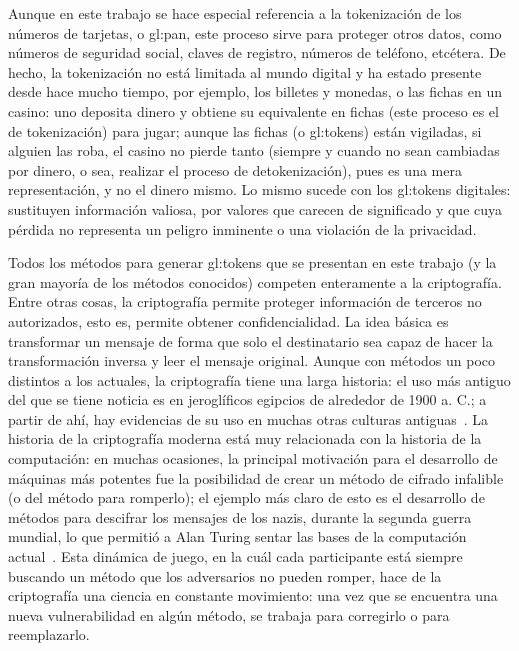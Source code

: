 Aunque en este trabajo se hace especial referencia a la tokenización de los
números de tarjetas, o \gls{gl:pan}, este proceso sirve para proteger otros
datos, como números de seguridad social, claves de registro, números de
teléfono, etcétera. De hecho, la tokenización no está limitada al mundo digital
y ha estado presente desde hace mucho tiempo, por ejemplo, los billetes y
monedas, o las fichas en un casino: uno deposita dinero y obtiene su
equivalente en fichas (este proceso es el de tokenización) para jugar; aunque
las fichas (o \glspl{gl:token}) están vigiladas, si alguien las roba, el casino
no pierde tanto (siempre y cuando no sean cambiadas por dinero, o sea, realizar
el proceso de detokenización), pues es una mera representación, y no el dinero
mismo. Lo mismo sucede con los \glspl{gl:token} digitales: sustituyen
información valiosa, por valores que carecen de significado y que cuya pérdida
no representa un peligro inminente o una violación de la privacidad.

Todos los métodos para generar \glspl{gl:token} que se presentan en este trabajo
(y la gran mayoría de los métodos conocidos) competen enteramente a la
criptografía. Entre otras cosas, la criptografía permite proteger información de
terceros no autorizados, esto es, permite obtener confidencialidad. La idea
básica es transformar un mensaje de forma que solo el destinatario sea capaz
de hacer la transformación inversa y leer el mensaje original. Aunque con
métodos un poco distintos a los actuales, la criptografía tiene una larga
historia: el uso más antiguo del que se tiene noticia es en jeroglíficos
egipcios de alrededor de 1900 a. C.; a partir de ahí, hay evidencias de su uso
en muchas otras culturas antiguas~\cite{codebreakers}. La historia de la
criptografía moderna está muy relacionada con la historia de la computación: en
muchas ocasiones, la principal motivación para el desarrollo de máquinas más
potentes fue la posibilidad de crear un método de cifrado infalible (o del
método para romperlo); el ejemplo más claro de esto es el desarrollo de
métodos para descifrar los mensajes de los nazis, durante la segunda guerra
mundial, lo que permitió a Alan Turing sentar las bases de la computación
actual~\cite{simon_singht}. Esta dinámica de juego, en la cuál cada participante
está siempre buscando un método que los adversarios no pueden romper,
hace de la criptografía una ciencia en constante movimiento: una vez que
se encuentra una nueva vulnerabilidad en algún método, se trabaja para
corregirlo o para reemplazarlo.

